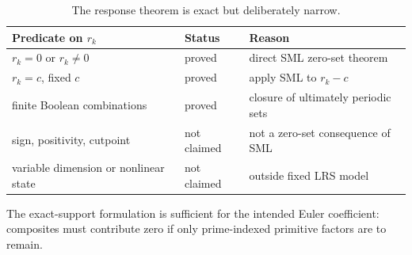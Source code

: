 \begin{table}[t]
\centering
\caption{The response theorem is exact but deliberately narrow.}
\label{tab:responseboundary}
\small
\begin{tabularx}{\textwidth}{L{3.4cm}L{3.0cm}Y}
\toprule
Predicate on \(r_k\) & Status & Reason \\
\midrule
\(r_k=0\) or \(r_k\ne0\)
& proved
& direct SML zero-set theorem \\
\(r_k=c\), fixed \(c\)
& proved
& apply SML to \(r_k-c\) \\
finite Boolean combinations
& proved
& closure of ultimately periodic sets \\
sign, positivity, cutpoint
& not claimed
& not a zero-set consequence of SML \\
variable dimension or nonlinear state
& not claimed
& outside fixed LRS model \\
\bottomrule
\end{tabularx}
\end{table}

The exact-support formulation is sufficient for the intended Euler
coefficient: composites must contribute zero if only prime-indexed
primitive factors are to remain.
